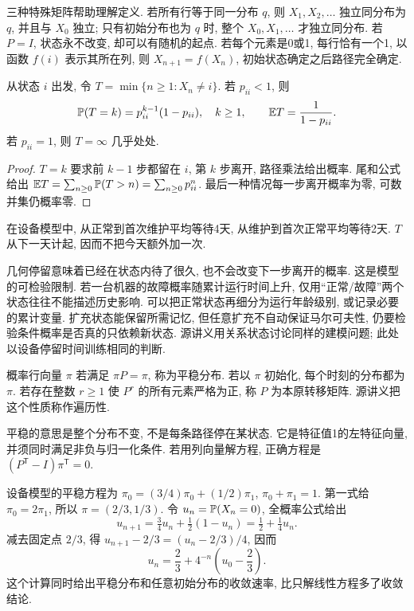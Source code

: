 三种特殊矩阵帮助理解定义. 若所有行等于同一分布 $q$, 则 $X_1,X_2,\ldots$ 独立同分布为 $q$, 并且与 $X_0$ 独立; 只有初始分布也为 $q$ 时, 整个 $X_0,X_1,\ldots$ 才独立同分布. 若 $P=I$, 状态永不改变, 却可以有随机的起点. 若每个元素是0或1, 每行恰有一个1, 以函数 $f(i)$ 表示其所在列, 则 $X_{n+1}=f(X_n)$, 初始状态确定之后路径完全确定.

\begin{proposition}
从状态 $i$ 出发, 令 $T=\min\{n\geq1:X_n\ne i\}$. 若 $p_{ii}<1$, 则
\[\mathbb P(T=k)=p_{ii}^{k-1}(1-p_{ii}),\quad k\geq1,\qquad \mathbb E T=\frac1{1-p_{ii}}.\]
若 $p_{ii}=1$, 则 $T=\infty$ 几乎处处.
\end{proposition}
\begin{proof}
$T=k$ 要求前 $k-1$ 步都留在 $i$, 第 $k$ 步离开, 路径乘法给出概率. 尾和公式给出 $\mathbb E T=\sum_{n\geq0}\mathbb P(T>n)=\sum_{n\geq0}p_{ii}^n$. 最后一种情况每一步离开概率为零, 可数并集仍概率零.
\end{proof}
在设备模型中, 从正常到首次维护平均等待4天, 从维护到首次正常平均等待2天. $T$ 从下一天计起, 因而不把今天额外加一次.

几何停留意味着已经在状态内待了很久, 也不会改变下一步离开的概率. 这是模型的可检验限制. 若一台机器的故障概率随累计运行时间上升, 仅用“正常/故障”两个状态往往不能描述历史影响. 可以把正常状态再细分为运行年龄级别, 或记录必要的累计变量. 扩充状态能保留所需记忆, 但任意扩充不自动保证马尔可夫性, 仍要检验条件概率是否真的只依赖新状态. 源讲义用关系状态讨论同样的建模问题; 此处以设备停留时间训练相同的判断.

\begin{definition}
概率行向量 $\pi$ 若满足 $\pi P=\pi$, 称为平稳分布. 若以 $\pi$ 初始化, 每个时刻的分布都为 $\pi$. 若存在整数 $r\geq1$ 使 $P^r$ 的所有元素严格为正, 称 $P$ 为本原转移矩阵. 源讲义把这个性质称作遍历性.
\end{definition}
平稳的意思是整个分布不变, 不是每条路径停在某状态. 它是特征值1的左特征向量, 并须同时满足非负与归一化条件. 若用列向量解方程, 正确方程是 $(P^{\mathsf T}-I)\pi^{\mathsf T}=0$.
\begin{example}
设备模型的平稳方程为
$\pi_0=(3/4)\pi_0+(1/2)\pi_1$, $\pi_0+\pi_1=1$.
第一式给 $\pi_0=2\pi_1$, 所以 $\pi=(2/3,1/3)$. 令 $u_n=\mathbb P(X_n=0)$, 全概率公式给出
\[u_{n+1}=\tfrac34u_n+\tfrac12(1-u_n)=\tfrac12+\tfrac14u_n.\]
减去固定点 $2/3$, 得 $u_{n+1}-2/3=(u_n-2/3)/4$, 因而
\[u_n=\frac23+4^{-n}\left(u_0-\frac23\right).\]
这个计算同时给出平稳分布和任意初始分布的收敛速率, 比只解线性方程多了收敛结论.
\end{example}

